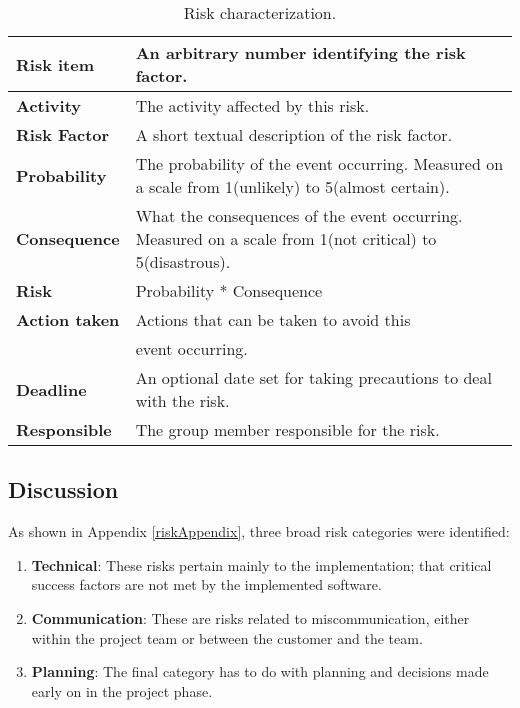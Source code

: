 \begin{table}[htdp]
\begin{center}
\begin{tabularx}{\textwidth}{| X | X |}
\hline
\textbf{Risk item} & An arbitrary number identifying the risk factor. \\
\hline
\textbf{Activity} & The activity affected by this risk. \\
\hline
\textbf{Risk Factor} & A short textual description of the risk factor. \\
\hline
\textbf{Probability} & The probability of the event occurring. Measured on a scale from 1(unlikely) to 5(almost certain).\\
\hline
\textbf{Consequence} & What the consequences of the event occurring. Measured on a scale from 1(not critical) to 5(disastrous).\\
\hline
\textbf{Risk} & Probability * Consequence\\
\hline
\textbf{Action taken} & Actions that can be taken to avoid this\\ & event occurring. \\
\hline
\textbf{Deadline} & An optional date set for taking precautions to deal with the risk. \\
\hline
\textbf{Responsible} & The group member responsible for the risk. \\
\hline
\end{tabularx}
\caption{Risk characterization.}
\end{center}
\label{riskTable}
\end{table}



\subsection{Discussion}

As shown in Appendix \ref{riskAppendix}, three broad risk categories were identified:

\begin{enumerate}
\item \textbf{Technical}: These risks pertain mainly to the  implementation; that critical success factors are not met by the implemented software.
\item \textbf{Communication}: These are risks related to miscommunication, either within the project team or between the customer and the team.
\item \textbf{Planning}: The final category has to do with planning and decisions made early on in the project phase.
\end{enumerate}


